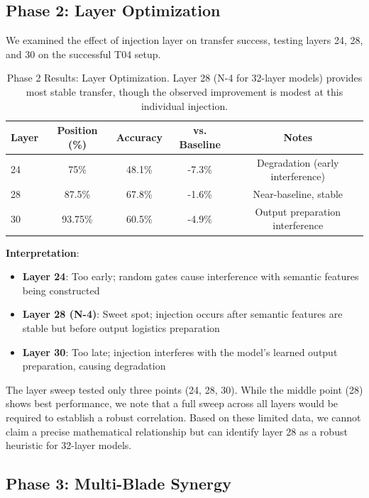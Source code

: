 \documentclass[11pt,a4paper]{article}
\begin{document}
\subsection{Phase 2: Layer Optimization}

We examined the effect of injection layer on transfer success, testing layers 24, 28, and 30 on the successful T04 setup.

\begin{table}[ht]
\centering
\begin{tabular}{lcccc}
\toprule
\textbf{Layer} & \textbf{Position (\%)} & \textbf{Accuracy} & \textbf{vs. Baseline} & \textbf{Notes} \\
\midrule
24 & 75\% & 48.1\% & -7.3\% & Degradation (early interference) \\
28 & 87.5\% & 67.8\% & -1.6\% & Near-baseline, stable \\
30 & 93.75\% & 60.5\% & -4.9\% & Output preparation interference \\
\bottomrule
\end{tabular}
\caption{Phase 2 Results: Layer Optimization. Layer 28 (N-4 for 32-layer models) provides most stable transfer, though the observed improvement is modest at this individual injection.}
\label{tab:phase2}
\end{table}

\textbf{Interpretation}:

\begin{itemize}
    \item \textbf{Layer 24}: Too early; random gates cause interference with semantic features being constructed
    \item \textbf{Layer 28 (N-4)}: Sweet spot; injection occurs after semantic features are stable but before output logistics preparation
    \item \textbf{Layer 30}: Too late; injection interferes with the model's learned output preparation, causing degradation
\end{itemize}

The layer sweep tested only three points (24, 28, 30). While the middle point (28) shows best performance, we note that a full sweep across all layers would be required to establish a robust correlation. Based on these limited data, we cannot claim a precise mathematical relationship but can identify layer 28 as a robust heuristic for 32-layer models.

\subsection{Phase 3: Multi-Blade Synergy}
\end{document}
